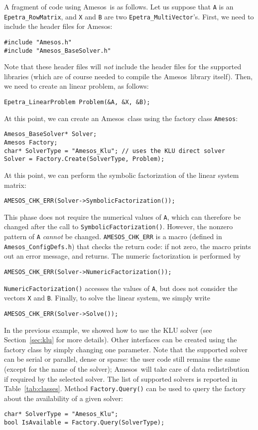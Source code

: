 \documentclass[11pt]{SANDreport}
\newcommand{\amesos}{{\sc Amesos}}
\begin{document}
A fragment of code using \amesos\ is as follows.
Let us suppose that \verb!A! is an \verb!Epetra_RowMatrix!, and \verb!X! and
\verb!B! are two \verb!Epetra_MultiVector!'s. 
First,
  we need to include the header files for \amesos:
\begin{verbatim}
#include "Amesos.h"
#include "Amesos_BaseSolver.h"
\end{verbatim}
Note that these header files will {\sl not} include the header files for the
supported libraries (which are of course needed to compile the \amesos\
library itself).  Then, we need to create an linear problem, as follows:
\begin{verbatim}
Epetra_LinearProblem Problem(&A, &X, &B);
\end{verbatim}
At this point, we can create an \amesos\ class using the factory class
\verb!Amesos!:
\begin{verbatim}
Amesos_BaseSolver* Solver;
Amesos Factory;
char* SolverType = "Amesos_Klu"; // uses the KLU direct solver
Solver = Factory.Create(SolverType, Problem);
\end{verbatim}
At this point, we can perform the symbolic factorization
of the linear system matrix:
\begin{verbatim}
AMESOS_CHK_ERR(Solver->SymbolicFactorization());
\end{verbatim}
This phase does not require the numerical values of \verb!A!, which can
therefore be changed after the call to \verb!SymbolicFactorization()!.
However,  the nonzero pattern of \verb!A! {\em cannot} be
changed.
\verb!AMESOS_CHK_ERR! is a macro (defined in \verb!Amesos_ConfigDefs.h!)
that checks the return code: if not zero, the
macro prints out an error message, and returns.
The numeric factorization is performed by
\begin{verbatim}
AMESOS_CHK_ERR(Solver->NumericFactorization());
\end{verbatim}
\verb!NumericFactorization()! accesses the values of \verb!A!, but does not
consider the vectors \verb!X! and \verb!B!. Finally, to solve the linear
system, we simply write
\begin{verbatim}
AMESOS_CHK_ERR(Solver->Solve());
\end{verbatim}

In the previous example, we showed how to use the KLU solver 
(see Section~\ref{sec:klu} for more details). Other interfaces
can be created using the factory class by simply changing one parameter. Note
that the supported solver can be serial or parallel, dense or sparse: the user
code still remains the same (except for the name of the solver); \amesos\ will
take care of data redistribution if required by the selected solver. The list
of supported solvers is reported in Table~\ref{tab:classes}. 
 Method
\verb!Factory.Query()! can be used to query the factory about the
availability of a given solver:
\begin{verbatim}
char* SolverType = "Amesos_Klu";
bool IsAvailable = Factory.Query(SolverType);
\end{verbatim}
\end{document}
